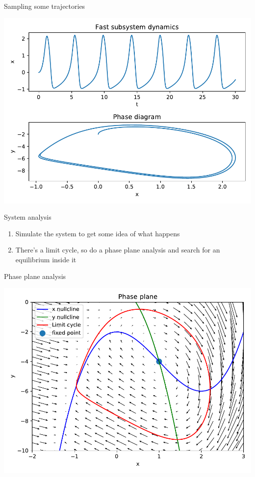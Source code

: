 \documentclass[presentation]{beamer}
\begin{document}
\begin{frame}[label={sec:org8107955}]{Sampling some trajectories}
\begin{center}
\includegraphics[height=.9\textheight]{./trajectory.pdf}
\end{center}
\end{frame}

\begin{frame}[label={sec:orgfeb376a}]{System analysis}
\begin{enumerate}
\item Simulate the system to get some idea of what happens
\item There's a limit cycle, so do a phase plane analysis and search for an equilibrium inside it
\end{enumerate}
\end{frame}

\begin{frame}[label={sec:orgeafab9e}]{Phase plane analysis}
\begin{center}
\includegraphics[height=.9\textheight]{./phaseplane.pdf}
\end{center}
\end{frame}
\end{document}
